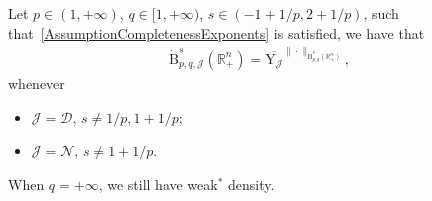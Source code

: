 \documentclass[10pt]{amsart}
\theoremstyle{definition}\newtheorem{defi}[theo]{Definition}\newtheorem{rema}[theo]{Remark}\newtheorem{exam}[theo]{Example}\newtheorem{exem}[theo]{Example}\newtheorem{nota}[theo]{Notation}
\newcommand{\bbR}{\mathbb{R}}
\newcommand{\rmB}{\mathrm{B}}
\newcommand{\rmY}{\mathrm{Y}}
\newcommand{\clN}{\mathcal{N}}
\newcommand{\clJ}{\mathcal{J}}
\newcommand{\clD}{\mathcal{D}}
\begin{document}
\begin{prop}\label{prop:DensityResultHomNeumDirBesov}
Let $p\in(1,+\infty)$, $q\in[1,+\infty)$, $s\in(-1+1/p,2+1/p)$, such that~\eqref{AssumptionCompletenessExponents} is satisfied, we have that
\begin{align*}
\dot{\rmB}^{s}_{p,q,\clJ}\left(\bbR^n_+\right) = \overline{\rmY_{\clJ}}^{\|\cdot\|_{\dot{\rmB}^{s}_{p,q}\left(\bbR^n_+\right)}},
\end{align*}
whenever
\begin{itemize}
\item $\clJ=\clD$, $s\neq 1/p,1+1/p$;
\item $\clJ=\clN$, $s\neq 1+1/p$.
\end{itemize}
When $q=+\infty$, we still have weak${}^\ast$ density.
\end{prop}
\end{document}
